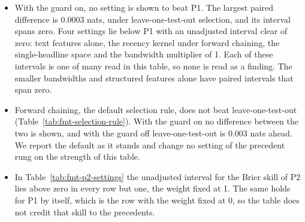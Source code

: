 \begin{itemize}
\item With the guard on, no setting is shown to beat P1. The largest paired difference is 0.0003 nats, under leave-one-test-out selection, and its interval spans zero. Four settings lie below P1 with an unadjusted interval clear of zero: text features alone, the recency kernel under forward chaining, the single-headline space and the bandwidth multiplier of 1. Each of these intervals is one of many read in this table, so none is read as a finding. The smaller bandwidths and structured features alone have paired intervals that span zero.
\item Forward chaining, the default selection rule, does not beat leave-one-test-out (Table~\ref{tab:fmt-selection-rule}). With the guard on no difference between the two is shown, and with the guard off leave-one-test-out is 0.003 nats ahead. We report the default as it stands and change no setting of the precedent rung on the strength of this table.
\item In Table~\ref{tab:fmt-p2-settings} the unadjusted interval for the Brier skill of P2 lies above zero in every row but one, the weight fixed at 1. The same holds for P1 by itself, which is the row with the weight fixed at 0, so the table does not credit that skill to the precedents.

\end{itemize}
